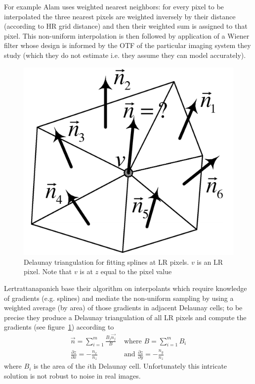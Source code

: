 For example Alam \cite{Alam2000} uses weighted nearest neighbors: for every pixel to be interpolated the three nearest pixels are weighted inversely by their distance (according to HR grid distance) and then their weighted sum is assigned to that pixel.
%
This non-uniform interpolation is then followed by application of a Wiener filter whose design is informed by the OTF of the particular imaging system they study (which they do not estimate i.e. they assume they can model accurately).
%
\begin{figure}
    \centering
    \includegraphics[width=.7\linewidth]{figures/delauney.png}
    \caption{Delaunay triangulation for fitting splines at LR pixels\cite{Lertrattanapanich}. $v$ is an LR pixel. Note that $v$ is at $z$ equal to the pixel value}
    \label{fig:delauney}
\end{figure}
Lertrattanapanich \cite{Lertrattanapanich} base their algorithm on interpolants which require knowledge of gradients (e.g. splines) and mediate the non-uniform sampling by using a weighted average (by area) of those gradients in adjacent Delaunay cells; to be precise they produce a Delaunay triangulation of all LR pixels and compute the gradients (see figure~\ref{fig:delauney}) according to
\begin{align*}
    \vec{n} = \sum_{i=1}^m \frac{B_j \vec{n_j}}{B} &\text{ where } B=\sum_{i=1}^m B_i\\
    \frac{\partial z}{\partial x} = -\frac{n_x}{n_z} &\text{ and }  \frac{\partial z}{\partial y} = -\frac{n_y}{n_z}
\end{align*}
where $B_i$ is the area of the $i$th Delaunay cell.
%
Unfortunately this intricate solution is not robust to noise in real images.

